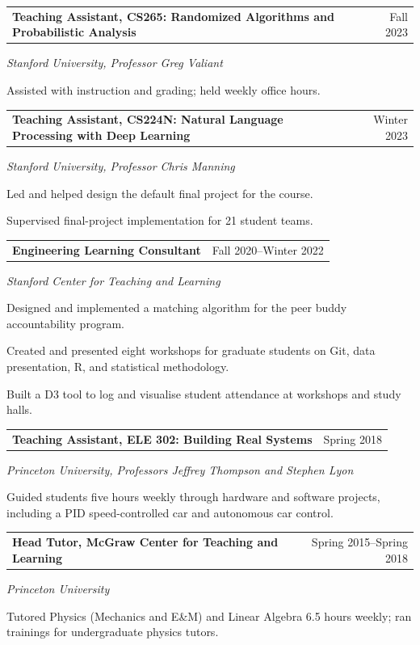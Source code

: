 \documentclass[11pt,letterpaper]{article}
\makeatletter
\newcommand{\entry}[2]{%
  \noindent\begin{tabularx}{\textwidth}{@{}X r@{}}
    #1 & {\small\color{inksoft}#2}
  \end{tabularx}\par
}
\newcommand{\role}[3]{%
  \entry{\textbf{#1}}{#3}%
  {\small\itshape\color{inksoft}#2}\par\vspace{0.15em}
}
\makeatother
\begin{document}
\role{Teaching Assistant, CS265: Randomized Algorithms and Probabilistic Analysis}{Stanford University, Professor Greg Valiant}{Fall 2023}
\begin{bullets}
  \item Assisted with instruction and grading; held weekly office hours.
\end{bullets}

\vspace{0.4em}
\role{Teaching Assistant, CS224N: Natural Language Processing with Deep Learning}{Stanford University, Professor Chris Manning}{Winter 2023}
\begin{bullets}
  \item Led and helped design the default final project for the course.
  \item Supervised final-project implementation for 21 student teams.
\end{bullets}

\vspace{0.4em}
\role{Engineering Learning Consultant}{Stanford Center for Teaching and Learning}{Fall 2020--Winter 2022}
\begin{bullets}
  \item Designed and implemented a matching algorithm for the peer buddy accountability program.
  \item Created and presented eight workshops for graduate students on Git, data presentation, R, and statistical methodology.
  \item Built a D3 tool to log and visualise student attendance at workshops and study halls.
\end{bullets}

\vspace{0.4em}
\role{Teaching Assistant, ELE 302: Building Real Systems}{Princeton University, Professors Jeffrey Thompson and Stephen Lyon}{Spring 2018}
\begin{bullets}
  \item Guided students five hours weekly through hardware and software projects, including a PID speed-controlled car and autonomous car control.
\end{bullets}

\vspace{0.4em}
\role{Head Tutor, McGraw Center for Teaching and Learning}{Princeton University}{Spring 2015--Spring 2018}
\begin{bullets}
  \item Tutored Physics (Mechanics and E\&M) and Linear Algebra 6.5 hours weekly; ran trainings for undergraduate physics tutors.
\end{bullets}
\end{document}
